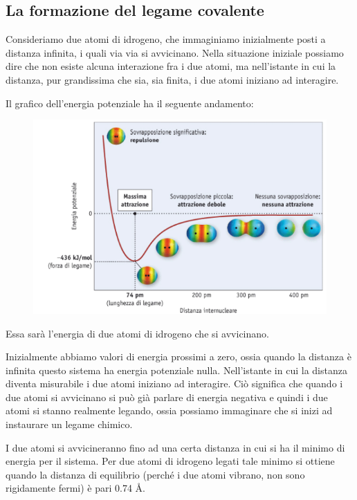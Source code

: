 \subsection{La formazione del legame covalente}
Consideriamo due atomi di idrogeno, che immaginiamo inizialmente posti a distanza infinita, i quali via via si avvicinano. Nella situazione iniziale possiamo dire che non esiste alcuna interazione fra i due atomi, ma nell'istante in cui la distanza, pur grandissima che sia, sia finita, i due atomi iniziano ad interagire.

Il grafico dell'energia potenziale ha il seguente andamento:

\vspace{-0.4cm}\hspace{-1cm}\begin{figure}[htp]
    \centering
    \includegraphics[width=12cm]{immagini/energia-potenziale.png}
\end{figure}

\vspace{-0.3cm}Essa sarà l'energia di due atomi di idrogeno che si avvicinano.

Inizialmente abbiamo valori di energia prossimi a zero, ossia quando la distanza è infinita questo sistema ha energia potenziale nulla. Nell'istante in cui la distanza diventa misurabile i due atomi iniziano ad interagire. Ciò significa che quando i due atomi si avvicinano si può già parlare di energia negativa e quindi i due atomi si stanno realmente legando, ossia possiamo immaginare che si inizi ad instaurare un legame chimico.

I due atomi si avvicineranno fino ad una certa distanza in cui si ha il minimo di energia per il sistema. Per due atomi di idrogeno legati tale minimo si ottiene quando la distanza di equilibrio (perché i due atomi vibrano, non sono rigidamente fermi) è pari 0.74 Å.

